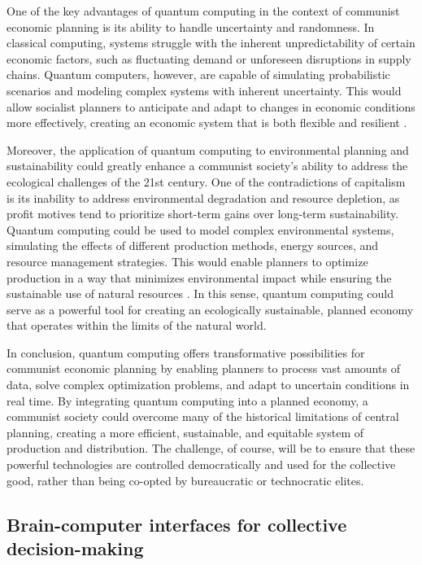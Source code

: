 \begin{refsection}
One of the key advantages of quantum computing in the context of communist economic planning is its ability to handle uncertainty and randomness. In classical computing, systems struggle with the inherent unpredictability of certain economic factors, such as fluctuating demand or unforeseen disruptions in supply chains. Quantum computers, however, are capable of simulating probabilistic scenarios and modeling complex systems with inherent uncertainty. This would allow socialist planners to anticipate and adapt to changes in economic conditions more effectively, creating an economic system that is both flexible and resilient \cite[pp.~110-115]{montanaro_uncertainty_quantum}.

Moreover, the application of quantum computing to environmental planning and sustainability could greatly enhance a communist society's ability to address the ecological challenges of the 21st century. One of the contradictions of capitalism is its inability to address environmental degradation and resource depletion, as profit motives tend to prioritize short-term gains over long-term sustainability. Quantum computing could be used to model complex environmental systems, simulating the effects of different production methods, energy sources, and resource management strategies. This would enable planners to optimize production in a way that minimizes environmental impact while ensuring the sustainable use of natural resources \cite[pp.~210-215]{nielsen_quantum_computing}. In this sense, quantum computing could serve as a powerful tool for creating an ecologically sustainable, planned economy that operates within the limits of the natural world.

In conclusion, quantum computing offers transformative possibilities for communist economic planning by enabling planners to process vast amounts of data, solve complex optimization problems, and adapt to uncertain conditions in real time. By integrating quantum computing into a planned economy, a communist society could overcome many of the historical limitations of central planning, creating a more efficient, sustainable, and equitable system of production and distribution. The challenge, of course, will be to ensure that these powerful technologies are controlled democratically and used for the collective good, rather than being co-opted by bureaucratic or technocratic elites.

\subsection{Brain-computer interfaces for collective decision-making}


\end{refsection}
